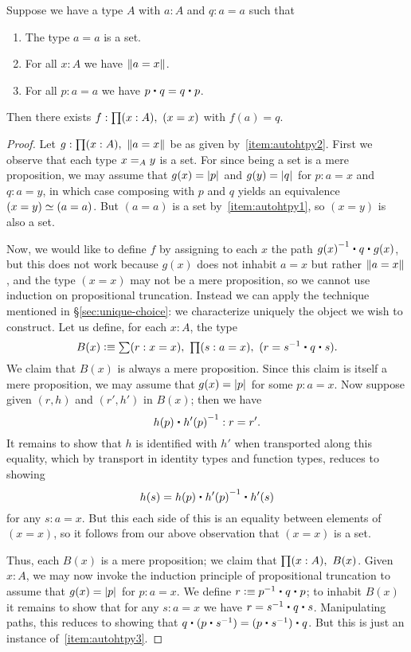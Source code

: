\begin{lem}\label{lem:autohtpy}
  Suppose we have a type $A$ with $a:A$ and $q:a=a$ such that
  \begin{enumerate}
  \item The type $a=a$ is a set.\label{item:autohtpy1}
  \item For all $x:A$ we have $\brck{a=x}$.\label{item:autohtpy2}
  \item For all $p:a=a$ we have $p\ct q = q \ct p$.\label{item:autohtpy3}
  \end{enumerate}
  Then there exists $f:\prd{x:A} (x=x)$ with $f(a)=q$.
\end{lem}
\begin{proof}
  Let $g:\prd{x:A} \brck{a=x}$ be as given by~\ref{item:autohtpy2}.
  First we observe that each type $\id[A]xy$ is a set.
  For since being a set is a mere proposition, we may assume that $g(x)=\bproj p$ and $g(y)=\bproj q$ for $p:a=x$ and $q:a=y$, in which case composing with $p$ and $q$ yields an equivalence $\eqv{(x=y)}{(a=a)}$.
  But $(a=a)$ is a set by~\ref{item:autohtpy1}, so $(x=y)$ is also a set.

  Now, we would like to define $f$ by assigning to each $x$ the path $\opp{g(x)} \ct q \ct g(x)$, but this does not work because $g(x)$ does not inhabit $a=x$ but rather $\brck{a=x}$, and the type $(x=x)$ may not be a mere proposition, so we cannot use induction on propositional truncation.
  Instead we can apply the technique mentioned in \S\ref{sec:unique-choice}: we characterize uniquely the object we wish to construct.
  Let us define, for each $x:A$, the type
  \[ B(x) \defeq \sm{r:x=x} \prd{s:a=x} (r = \opp s \ct q\ct s) .\]
  We claim that $B(x)$ is always a mere proposition.
  Since this claim is itself a mere proposition, we may assume that $g(x) = \bproj p$ for some $p:a=x$.
  Now suppose given $(r,h)$ and $(r',h')$ in $B(x)$; then we have
  \[ h(p) \ct \opp{h'(p)} : r = r'. \]
  It remains to show that $h$ is identified with $h'$ when transported along this equality, which by transport in identity types and function types, reduces to showing
  \[ h(s) = h(p) \ct \opp{h'(p)} \ct h'(s) \]
  for any $s:a=x$.
  But this each side of this is an equality between elements of $(x=x)$, so it follows from our above observation that $(x=x)$ is a set.

  Thus, each $B(x)$ is a mere proposition; we claim that $\prd{x:A} B(x)$.
  Given $x:A$, we may now invoke the induction principle of propositional truncation to assume that $g(x) = \bproj p$ for $p:a=x$.
  We define $r \defeq \opp p \ct q \ct p$; to inhabit $B(x)$ it remains to show that for any $s:a=x$ we have
  $r = \opp s \ct q \ct s$.
  Manipulating paths, this reduces to showing that $q\ct (p\ct \opp s) = (p\ct \opp s) \ct q$.
  But this is just an instance of~\ref{item:autohtpy3}.
\end{proof}

